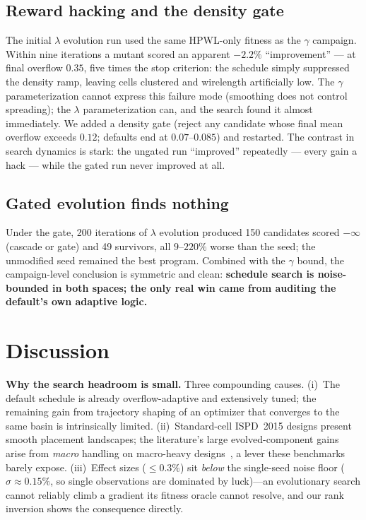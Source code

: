 \documentclass[conference]{IEEEtran}
\begin{document}
\subsection{Reward hacking and the density gate}
The initial $\lambda$ evolution run used the same HPWL-only fitness as the
$\gamma$ campaign. Within nine iterations a mutant scored an apparent
$-2.2\%$ ``improvement'' --- at final overflow $0.35$, five times the stop
criterion: the schedule simply suppressed the density ramp, leaving cells
clustered and wirelength artificially low. The $\gamma$ parameterization
cannot express this failure mode (smoothing does not control spreading);
the $\lambda$ parameterization can, and the search found it almost
immediately. We added a density gate (reject any candidate whose final
mean overflow exceeds $0.12$; defaults end at $0.07$--$0.085$) and
restarted. The contrast in search dynamics is stark: the ungated run
``improved'' repeatedly --- every gain a hack --- while the gated run
never improved at all.

\subsection{Gated evolution finds nothing}
Under the gate, 200 iterations of $\lambda$ evolution produced 150
candidates scored $-\infty$ (cascade or gate) and 49 survivors, all
$9$--$220\%$ worse than the seed; the unmodified seed remained the best
program. Combined with the $\gamma$ bound, the campaign-level conclusion
is symmetric and clean: \textbf{schedule search is noise-bounded in both
spaces; the only real win came from auditing the default's own adaptive
logic.}

\section{Discussion}

\textbf{Why the search headroom is small.} Three compounding causes. (i)~The
default schedule is already overflow-adaptive and extensively tuned; the
remaining gain from trajectory shaping of an optimizer that converges to
the same basin is intrinsically limited. (ii)~Standard-cell ISPD~2015
designs present smooth placement landscapes; the literature's large
evolved-component gains arise from \emph{macro} handling on macro-heavy
designs~\cite{yao2025evolution}, a lever these benchmarks barely expose.
(iii)~Effect sizes ($\leq0.3\%$) sit \emph{below} the single-seed noise
floor ($\sigma\approx0.15\%$, so single observations are dominated by
luck)---an evolutionary search cannot reliably climb a gradient its
fitness oracle cannot resolve, and our rank inversion shows the
consequence directly.
\end{document}
